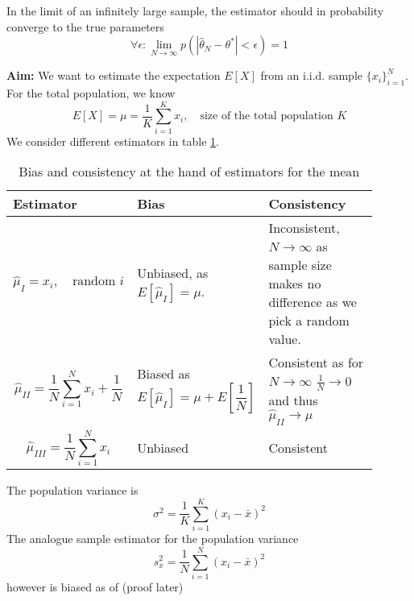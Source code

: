 In the limit of an infinitely large sample, the
estimator should in probability converge to the
true parameters
\begin{equation}
    \forall \epsilon: \lim_{N \rightarrow \infty} p(|\hat{\theta}_N - \theta^*| < \epsilon) = 1
\end{equation}

\textbf{Aim:} We want to estimate the expectation $E[X]$ from an i.i.d. sample
$\{x_i\}_{i=1}^N$. For the total population, we know
\begin{equation}
    E[X] = \mu = \frac{1}{K} \sum_{i=1}^{K} x_i, \quad \text{size of the total population } K
\end{equation}
We consider different estimators in table \ref{tab:bias_consist}.

\begin{table}
    \centering
    \begin{tabular}{|p{0.3\linewidth}|p{0.3\linewidth}|p{0.3\linewidth}|}
        \hline \textcolor{blue1}{Estimator} & \textcolor{blue1}{Bias} & \textcolor{blue1}{Consistency} \\
        \hline
        $$\hat{\mu}_I=x_i, \quad \text{random } i$$ 
        &
        Unbiased, as $E\left[\hat{\mu}_I\right]=\mu$. &
        Inconsistent, $N \rightarrow \infty$ as
        sample size makes no
        difference as we pick a 
        random value. \\
        \hline
        $$\hat{\mu}_{I I}=\frac{1}{N} \sum_{i=1}^N x_i+\frac{1}{N}$$ &
        Biased as
        $$E\left[\hat{\mu}_I\right]=\mu+E\left[\frac{1}{N}\right]$$
        &
        Consistent as for $N \rightarrow \infty$
        $\frac{1}{N} \rightarrow 0$ and thus $\hat{\mu}_{I I} \rightarrow \mu$
        \\
        \hline
        $$\hat{\mu}_{I I I}=\frac{1}{N} \sum_{i=1}^N x_i$$ & Unbiased & Consistent \\
        \hline
    \end{tabular}
    \caption{Bias and consistency at the hand of estimators for the mean}
    \label{tab:bias_consist}
\end{table}

The population variance is
\begin{equation}
    \sigma^2=\frac{1}{K} \sum_{i=1}^K\left(x_i-\bar{x}\right)^2
\end{equation}
The analogue sample estimator for the population variance
\begin{equation}
    s_x^2=\frac{1}{N} \sum_{i=1}^N\left(x_i-\bar{x}\right)^2
\end{equation}
however is biased as of (proof later)

